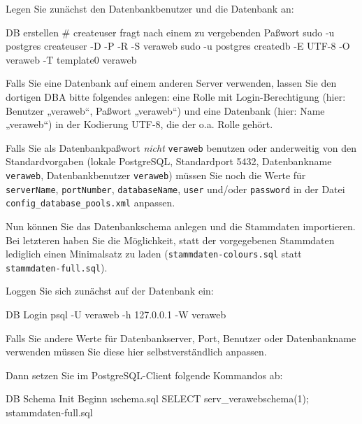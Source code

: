 \begin{minipage}{\linewidth}
Legen Sie zunächst den Datenbankbenutzer und die Datenbank an:

\begin{lstdump}{DB erstellen}
# createuser fragt nach einem zu vergebenden Paßwort
sudo -u postgres createuser -D -P -R -S veraweb
sudo -u postgres createdb -E UTF-8 -O veraweb -T template0 veraweb
\end{lstdump}
\end{minipage}

Falls Sie eine Datenbank auf einem anderen Server verwenden, lassen
Sie den dortigen DBA bitte folgendes anlegen: eine Rolle mit
Login-Berechtigung (hier: Benutzer „veraweb“, Paßwort „veraweb“)
und eine Datenbank (hier: Name „veraweb“) in der Kodierung UTF-8,
die der o.a. Rolle gehört.

Falls Sie als Datenbankpaßwort \emph{nicht} \texttt{veraweb} benutzen oder
anderweitig von den Standardvorgaben (lokale PostgreSQL, Standardport 5432,
Datenbankname \texttt{veraweb}, Datenbankbenutzer \texttt{veraweb}) müssen
Sie noch die Werte für \texttt{serverName}, \texttt{portNumber},
\texttt{databaseName}, \texttt{user} und/oder \texttt{password} in der
Datei \texttt{config\_database\_pools.xml} anpassen.

Nun können Sie das Datenbankschema anlegen und die Stammdaten importieren.
Bei letzteren haben Sie die Möglichkeit, statt der vorgegebenen Stammdaten
lediglich einen Minimalsatz zu laden (\texttt{stammdaten-colours.sql} statt
\texttt{stammdaten-full.sql}).

\begin{minipage}{\linewidth}
Loggen Sie sich zunächst auf der Datenbank ein:

\begin{lstdump}{DB Login}
psql -U veraweb -h 127.0.0.1 -W veraweb
\end{lstdump}
\end{minipage}

Falls Sie andere Werte für Datenbankserver, Port, Benutzer oder Datenbankname
verwenden müssen Sie diese hier selbstverständlich anpassen.

\begin{minipage}{\linewidth}
Dann setzen Sie im PostgreSQL-Client folgende Kommandos ab:

\begin{lstdump}{DB Schema Init Beginn}
\i schema.sql
SELECT serv_verawebschema(1);
\i stammdaten-full.sql
\end{lstdump}
\end{minipage}

